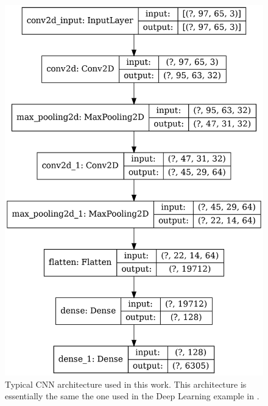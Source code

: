 \documentclass[12pt]{article}
\begin{document}
%
\begin{figure}[h] 
   \centering
    \includegraphics[totalheight=9cm]{Figures/typical_cnn.png}
    \caption{\label{fig:typical_cnn}Typical CNN architecture used in this work. This architecture is essentially the same the one used in the Deep Learning example in \cite{misc:udemy}.}
\end{figure}
%
%
\end{document}
